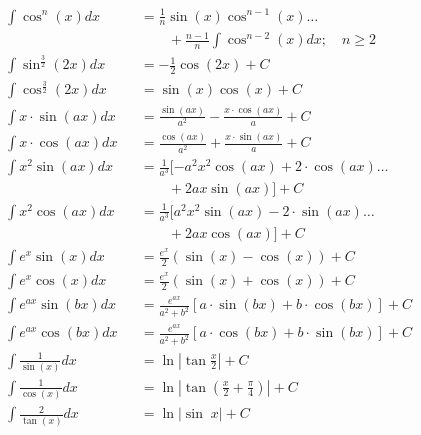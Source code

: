 \begin{small}
\begin{align*}
         & \int \cos^n(x) dx                &  & = \frac{1}{n}\sin(x)\cos^{n-1}(x) \dots                         \\
         &                                  &  & \qquad +\frac{n-1}{n}\int \cos^{n-2}(x) dx; \quad n\geq 2       \\
         & \int \sin^{\frac{3}{2}}(2x) dx   &  & = -\frac{1}{2}\cos(2x)+C                                        \\
         & \int \cos^{\frac{3}{2}}(2x) dx   &  & = \sin(x)\cos(x)+C                                              \\
         & \int x \cdot \sin(ax) dx         &  & = \frac{\sin(ax)}{a^2}-\frac{x \cdot \cos(ax)}{a}+C             \\
         & \int x \cdot \cos(ax) dx         &  & = \frac{\cos(ax)}{a^2}+\frac{x \cdot \sin(ax)}{a}+C             \\
         & \int x^2 \sin(ax) dx             &  & = \frac{1}{a^3} [-a^2x^2\cos(ax) + 2 \cdot \cos(ax) \dots       \\
         &                                  &  & \qquad + 2 ax \sin(ax)]+C                                       \\
         & \int x^2 \cos(ax) dx             &  & = \frac{1}{a^3} [a^2x^2\sin(ax) - 2 \cdot \sin(ax) \dots        \\
         &                                  &  & \qquad + 2ax \cos(ax)]+C                                        \\
         & \int e^x \sin(x) dx              &  & = \frac{e^x}{2}(\sin(x) - \cos(x))+C                            \\
         & \int e^x \cos(x) dx              &  & = \frac{e^x}{2}(\sin(x) + \cos(x))+C                            \\
         & \int e^{ax} \sin(bx)dx           &  & = \frac{e^{ax}}{a^2+b^2}[a\cdot \sin(bx)+b\cdot \cos(bx)]+C     \\
         & \int e^{ax} \cos(bx)dx           &  & = \frac{e^{ax}}{a^2+b^2}[a\cdot \cos(bx)+b\cdot \sin(bx)]+C     \\
         & \int \frac{1}{\sin(x)}dx         &  & = \ln\left| \tan\frac{x}{2}\right| +C                           \\
         & \int \frac{1}{\cos(x)}dx         &  & = \ln\left| \tan\left(\frac{x}{2}+\frac{\pi}{4}\right)\right|+C \\
         & \int \frac{2}{\tan(x)}dx         &  & = \ln\vert \sin\; x\vert +C                                     \\

\end{align*}
\end{small}
